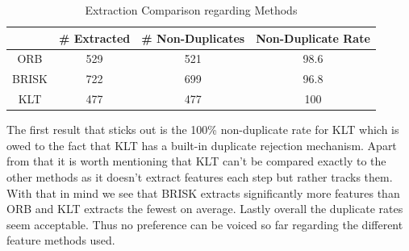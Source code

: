 {{        \begin{table}[!ht]
            \setlength{\extrarowheight}{5pt}
            \centering
            \large
            \begin{tabular}{cccc}
                 & \# Extracted & \# Non-Duplicates & Non-Duplicate Rate\\[12pt]
                \hline
                ORB & 529 & 521 & 98.6\\[12pt]
                \hline
                BRISK & 722 & 699 & 96.8\\[12pt]
                \hline
                KLT & 477 & 477 & 100\\[12pt]
                \hline
            \end{tabular}
            \caption{Extraction Comparison regarding Methods}
            \label{tab:extraction_methods}
        \end{table}
        
        The first result that sticks out is the 100\% non-duplicate rate for KLT which is owed to the fact that KLT has a built-in duplicate rejection mechanism. Apart from that it is worth mentioning that KLT can't be compared exactly to the other methods as it doesn't extract features each step but rather tracks them. With that in mind we see that BRISK extracts significantly more features than ORB and KLT extracts the fewest on average. Lastly overall the duplicate rates seem acceptable. Thus no preference can be voiced so far regarding the different feature methods used.
        
    }


}
\clearpage

